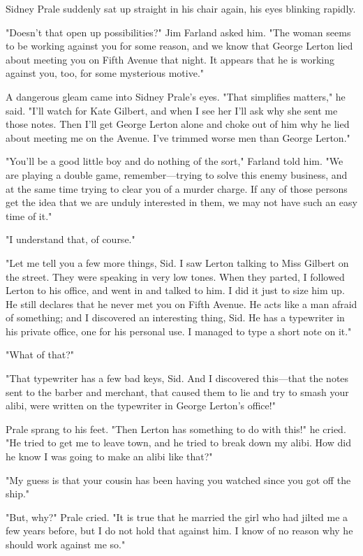 \documentclass{novel}
\begin{document}
Sidney Prale suddenly sat up straight in his chair again, his eyes blinking rapidly.

"Doesn't that open up possibilities?" Jim Farland asked him. "The woman seems to be working against you for some reason, and we know that George Lerton lied about meeting you on Fifth Avenue that night. It appears that he is working against you, too, for some mysterious motive."

A dangerous gleam came into Sidney Prale's eyes. "That simplifies matters," he said. "I'll watch for Kate Gilbert, and when I see her I'll ask why she sent me those notes. Then I'll get George Lerton alone and choke out of him why he lied about meeting me on the Avenue. I've trimmed worse men than George Lerton."

"You'll be a good little boy and do nothing of the sort," Farland told him. "We are playing a double game, remember---trying to solve this enemy business, and at the same time trying to clear you of a murder charge. If any of those persons get the idea that we are unduly interested in them, we may not have such an easy time of it."

"I understand that, of course."

"Let me tell you a few more things, Sid. I saw Lerton talking to Miss Gilbert on the street. They were speaking in very low tones. When they parted, I followed Lerton to his office, and went in and talked to him. I did it just to size him up. He still declares that he never met you on Fifth Avenue. He acts like a man afraid of something; and I discovered an interesting thing, Sid. He has a typewriter in his private office, one for his personal use. I managed to type a short note on it."

"What of that?"

"That typewriter has a few bad keys, Sid. And I discovered this---that the notes sent to the barber and merchant, that caused them to lie and try to smash your alibi, were written on the typewriter in George Lerton's office!"

Prale sprang to his feet. "Then Lerton has something to do with this!" he cried. "He tried to get me to leave town, and he tried to break down my alibi. How did he know I was going to make an alibi like that?"

"My guess is that your cousin has been having you watched since you got off the ship."

"But, why?" Prale cried. "It is true that he married the girl who had jilted me a few years before, but I do not hold that against him. I know of no reason why he should work against me so."
\end{document}
